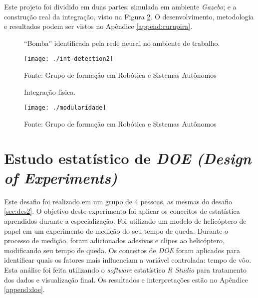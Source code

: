 Este projeto foi dividido em duas partes: simulada em ambiente \textit{Gazebo}; e a construção real da integração, visto na Figura \ref{img:curupira}. O desenvolvimento, metodologia e resultados podem ser vistos no Apêndice \ref{append:curupira}.

\begin{figure} [H]												
    \centering
    \caption{``Bomba'' identificada pela rede neural no ambiente de trabalho.}	
	\texttt{[image: ./int-detection2]}	
	\caption*{Fonte: Grupo de formação em Robótica e Sistemas Autônomos}
	\label{img:bomba}									 
\end{figure}

\begin{figure} [H]												
    \centering
    \caption{Integração física.}	
	\texttt{[image: ./modularidade]}	
	\caption*{Fonte: Grupo de formação em Robótica e Sistemas Autônomos}
	\label{img:curupira}									 
\end{figure}

\section{Estudo estatístico de \textit{DOE (Design of Experiments)}}
\label{sec:doe}

Este desafio foi realizado em um grupo de 4 pessoas, as mesmas do desafio \ref{sec:des2}. O objetivo deste experimento foi aplicar os conceitos de estatística aprendidos durante a especialização. Foi utilizado um modelo de helicóptero de papel em um experimento de medição do seu tempo de queda. Durante o processo de medição, foram adicionados adesivos e clipes ao helicóptero, modificando seu tempo de queda. Os conceitos de \textit{DOE} foram aplicados para identificar quais os fatores mais influenciam a variável controlada: tempo de vôo. Esta análise foi feita utilizando o \textit{software} estatístico \textit{R Studio} para tratamento dos dados e visualização final. Os resultados e interpretações estão no Apêndice \ref{append:doe}.